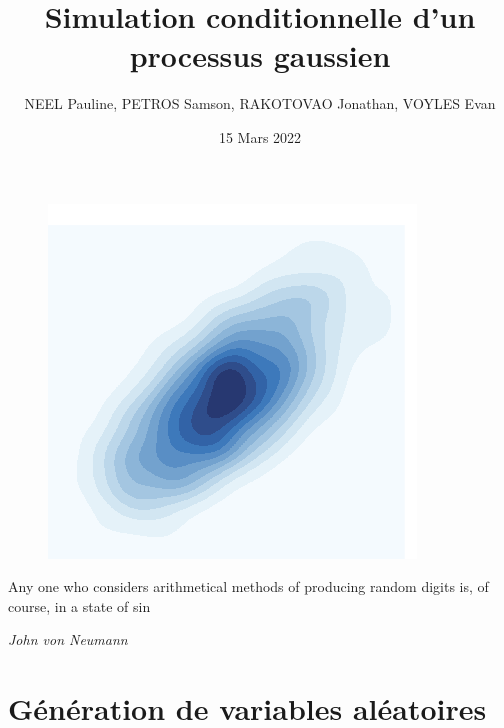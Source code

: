 \documentclass[10pt]{article} %
\title{Simulation conditionnelle d’un processus gaussien}
\author{NEEL Pauline, PETROS Samson, RAKOTOVAO Jonathan, VOYLES Evan}
\date{15 Mars 2022}
\begin{document}
\begin{titlepage}

\maketitle

\begin{figure}[h!]
    \centering
    \includegraphics{media/plot.png}
\end{figure}

\vspace{3cm}





\epigraph{Any one who considers arithmetical methods of producing random digits is, of course, in a state of sin}
 {\textit{John von Neumann}}

\newpage

\end{titlepage}

\pagestyle{fancy}

\section{Génération de variables aléatoires}
\end{document}
